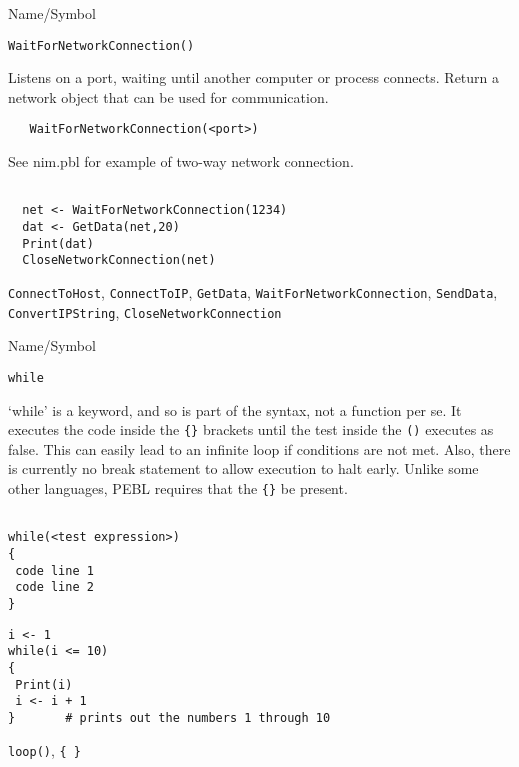 \rl





\begin{desc}{Name/Symbol}
\item[Name/Symbol]	\verb+WaitForNetworkConnection()+

\item[Description]	Listens on a port, waiting until another computer or process
  connects. Return a network object that can be used for communication.

\item[Usage]
\begin{verbatim}
   WaitForNetworkConnection(<port>)
\end{verbatim}

\item[Example]	

  See nim.pbl for example of two-way network connection.
\begin{verbatim}

  net <- WaitForNetworkConnection(1234)
  dat <- GetData(net,20)
  Print(dat)
  CloseNetworkConnection(net)
\end{verbatim}

\item[See Also]
  \verb+ConnectToHost+, \verb+ConnectToIP+, \verb+GetData+, \verb+WaitForNetworkConnection+,
   \verb+SendData+, \verb+ConvertIPString+, \verb+CloseNetworkConnection+
\end{desc}

\rl


\begin{desc}{Name/Symbol}
\item[Name/Symbol]	\verb+while+

\item[Description] `while' is a keyword, and so is part of the syntax,
  not a function per se.  It executes the code inside the \verb+{}+
  brackets until the test inside the \verb+()+ executes as false.
  This can easily lead to an infinite loop if conditions are not met.
  Also, there is currently no break statement to allow execution to
  halt early.  Unlike some other languages, PEBL requires that the
  \verb+{}+ be present.

\item[Usage]
\begin{verbatim}

while(<test expression>)
{
 code line 1
 code line 2
}
\end{verbatim}

\item[Example] 
\begin{verbatim}
i <- 1
while(i <= 10)
{
 Print(i)
 i <- i + 1
}		# prints out the numbers 1 through 10
\end{verbatim}

\item[See Also] 	\verb+loop()+, \verb+{ }+


\end{desc}

